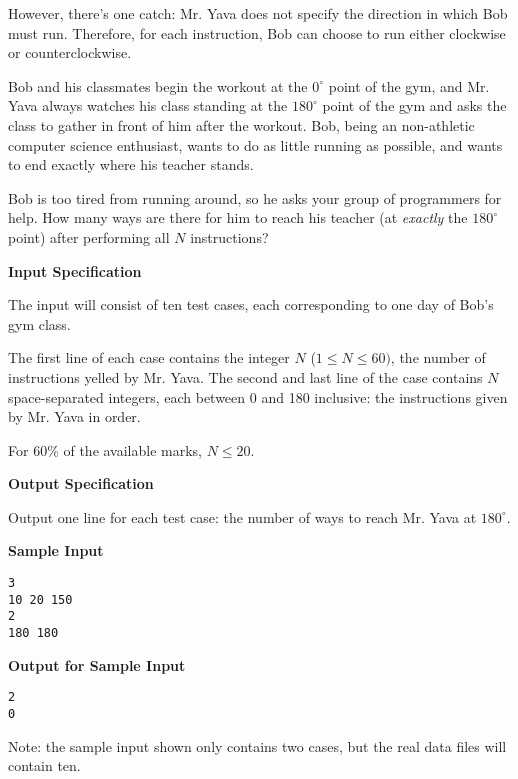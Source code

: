 \documentclass[11pt]{article}
\newcommand{\heading}[1]{\vspace{0.6em} \textbf{#1}}
\begin{document}
However, there's one catch: Mr. Yava does not specify the direction in which Bob must run. Therefore, for each instruction, Bob can choose to run either clockwise or counterclockwise.

Bob and his classmates begin the workout at the $0^{\circ}$ point of the gym, and Mr. Yava always watches his class standing at the $180^{\circ}$ point of the gym and asks the class to gather in front of him after the workout. Bob, being an non-athletic computer science enthusiast, wants to do as little running as possible, and wants to end exactly where his teacher stands.

Bob is too tired from running around, so he asks your group of programmers for help. How many ways are there for him to reach his teacher (at \textit{exactly} the $180^{\circ}$ point) after performing all $N$ instructions?


\heading{Input Specification}

The input will consist of ten test cases, each corresponding to one day of Bob's gym class.

The first line of each case contains the integer $N$ ($1 \le N \le 60)$, the number of instructions yelled by Mr. Yava. The second and last line of the case contains $N$ space-separated integers, each between 0 and 180 inclusive: the instructions given by Mr. Yava in order.

For 60\% of the available marks, $N \le 20$.


\heading{Output Specification}

Output one line for each test case: the number of ways to reach Mr. Yava at $180^{\circ}$.


\heading{Sample Input}
\vspace{-\topsep}
\begin{verbatim}
3
10 20 150
2
180 180
\end{verbatim}

\vspace{-\topsep}
\heading{Output for Sample Input}
\vspace{-\topsep}
\begin{verbatim}
2
0
\end{verbatim}

Note: the sample input shown only contains two cases, but the real data files will contain ten.

\end{document}
